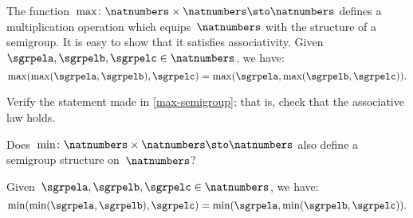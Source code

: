 \begin{example}
    \label{max-semigroup}
    The function~$\max \colon \natnumbers \times \natnumbers \sto \natnumbers$ defines a multiplication operation which equips~$\natnumbers$ with the structure of a semigroup.
    It is easy to show that it satisfies associativity.
    Given~$\sgrpela,\sgrpelb,\sgrpelc\in \natnumbers$, we have:
    \begin{equation*}
        \label{eq:max-assoc}
        \max(\max(\sgrpela,\sgrpelb),\sgrpelc)=\max(\sgrpela,\max(\sgrpelb,\sgrpelc)).
    \end{equation*}
\end{example}

\begin{exercise}
    \label{ex:max-semigroup}
    Verify the statement made in \cref{max-semigroup}; that is, check that the associative law holds.
    
    Does~$\min \colon \natnumbers \times \natnumbers \sto \natnumbers$ also define a semigroup structure on~$\natnumbers$?
\end{exercise}
\begin{solution}
    Given~$\sgrpela,\sgrpelb,\sgrpelc\in \natnumbers$, we have:
    \begin{equation*}
        \label{eq:min-assoc}
        \min(\min(\sgrpela,\sgrpelb),\sgrpelc)=\min(\sgrpela,\min(\sgrpelb,\sgrpelc)).
    \end{equation*}
\end{solution}

